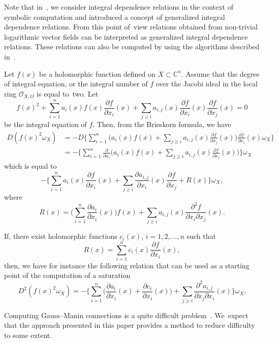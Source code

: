 \documentclass[pdftex]{sigma}%
\numberwithin{equation}{section}
\begin{document}
Note that in~\cite{NT20}, we consider integral dependence relations in the context of symbolic computation and introduced a concept of generalized integral dependence relations. From this point of~view relations obtained from non-trivial logarithmic vector fields can be interpreted as genera\-lized integral dependence relations. These relations can also be computed by using the algorithms described in~\cite{NT20}.

Let $ f(x) $ be a holomorphic function defined on $X \subset {\mathbb C}^n$. Assume that the degree of integral equation, or the integral number of $f$ over the Jacobi ideal in the local ring ${\mathcal O}_{X,O}$ is equal to~two. Let
\[
f(x)^2 + \sum_{i=1}^{n} a_i(x)f(x)\frac{\partial f}{\partial x_i}(x)+ \sum_{j \ge i} a_{i,j}(x)
\frac{\partial f}{\partial x_i}(x)\frac{\partial f}{\partial x_j}(x) = 0
\]
be the integral equation of $f$. Then, from the Brieskorn formula, we have
\begin{align*}
D(f(x)^2\omega_X) &= -D\Bigg\{ \sum_{i=1}^{n}\Bigg(a_i(x)f(x) + \sum_{j \ge i} a_{i,j}(x)\frac{\partial f}{\partial x_j}(x)\Bigg)\frac{\partial f}{\partial x_i}(x) \omega_X \Bigg\}
\\
&=-\Bigg\{ \sum_{i=1}^{n}\frac{\partial}{\partial x_i} \Bigg(a_i(x)f(x) + \sum_{j \ge i}
 a_{i,j}(x)\frac{\partial f}{\partial x_j}(x)\Bigg) \Bigg\} \omega_X
\end{align*}
which is equal to
\[
-\Bigg\{ \sum_{i=1}^{n}a_i(x)\frac{\partial f}{\partial x_i}(x) +
 \sum_{j \ge i} \frac{\partial a_{i,j}}{\partial x_i}(x)\frac{\partial f} {\partial x_j} + R(x) \Bigg\} \omega_X,
 \]
where
\[
R(x) = \bigg( \sum_{i=1}^{n} \frac{\partial a_i}{\partial x_i}(x)\bigg)f(x) +
 \sum_{j \ge i} a_{i,j}(x)\frac{\partial^2 f}{\partial x_i \partial x_j} (x).
 \]

If, there exist holomorphic functions $c_i(x)$, $i=1,2,\ldots,n$ such that
\[
R(x) = \sum_{i=1}^{n} c_i(x)\frac{\partial f}{\partial x_i}(x),
\]
then, we have for instance the following relation that can be used as a starting point of the computation of a saturation
\[
D^2(f(x)^2\omega_X) = -\Bigg\{ \sum_{i=1}^{n} \bigg(\frac{\partial a_i}{\partial x_i}(x)
+ \frac{\partial c_i}{\partial x_i}(x) \bigg) + \sum_{ j \ge i}
\frac{\partial^2 a_{i,j}}{\partial x_j \partial x_i}(x) \Bigg\} \omega_X.
 \]

Computing Gauss--Manin connections is a quite difficult problem~\cite{D,Gu,Sch,Sch93,vS}. We~expect that the approach presented in this paper provides a method to reduce difficulty to some extent.
\end{document}
